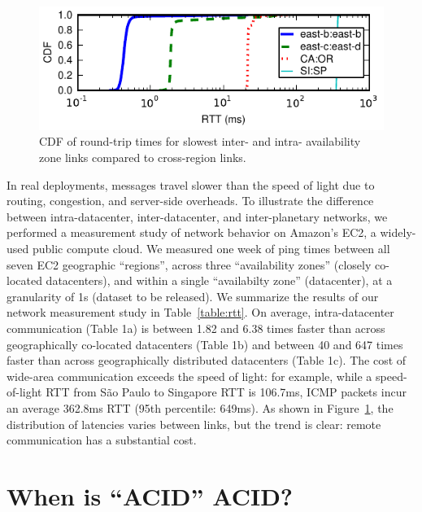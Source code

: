 \begin{figure}[t!]
\includegraphics[width=\columnwidth]{figs/ping-plot.pdf}\vspace{-1em}
\caption{CDF of round-trip times for slowest inter- and intra-
  availability zone links compared to cross-region links.}\vspace{-1em}
\label{fig:rtt}
\end{figure}

In real deployments, messages travel slower than the speed of light
due to routing, congestion, and server-side overheads. To illustrate
the difference between intra-datacenter, inter-datacenter, and
inter-planetary networks, we performed a measurement study of network
behavior on Amazon's EC2, a widely-used public compute cloud. We
measured one week of ping times between all seven EC2 geographic
``regions'', across three ``availability zones'' (closely co-located
datacenters), and within a single ``availabilty zone'' (datacenter),
at a granularity of 1s (dataset to be released). We summarize the
results of our network measurement study in Table~\ref{table:rtt}. On
average, intra-datacenter communication (Table 1a) is between 1.82 and
6.38 times faster than across geographically co-located datacenters
(Table 1b) and between 40 and 647 times faster than across
geographically distributed datacenters (Table 1c). The cost of
wide-area communication exceeds the speed of light: for example, while
a speed-of-light RTT from S\~{a}o Paulo to Singapore RTT is 106.7ms,
ICMP packets incur an average 362.8ms RTT (95th percentile: 649ms). As
shown in Figure~\ref{fig:rtt}, the distribution of latencies varies
between links, but the trend is clear: remote communication has a
substantial cost.

\section{When is ``ACID'' ACID?}
\label{sec:modernacid}

